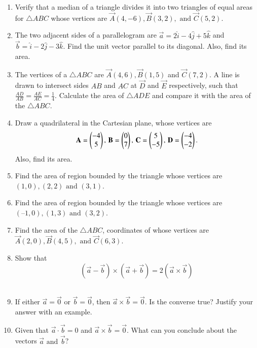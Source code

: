 \begin{enumerate}[label=\thesection.\arabic*,ref=\thesection.\theenumi]
\item Verify that a median of a triangle divides it into two triangles of equal areas for $\triangle ABC$ whose vertices are $\vec{A}(4, -6), \vec{B}(3, 2), \text{ and } \vec{C}(5, 2)$. 
		\label{10/7/3/5}
		\\
\solution
		
\item The two adjacent sides of a parallelogram are 
$\vec{a}= 2\hat{i}-4\hat{j}+5\hat{k}$  and  $\vec{b} =\hat{i}-2\hat{j}-3\hat{k}$.
Find the unit vector parallel to its diagonal. Also, find its area.\\
	\solution
		
\item The vertices of a $\triangle ABC$ are $\vec{A}(4,6), \vec{B}(1,5)$ and  $\vec{C}(7,2)$. A line is drawn to intersect sides $AB$ and $AC$ at $\vec{D}$ and $\vec{E}$ respectively, such that $\frac{AD}{AB} = \frac{AE}{AC} = \frac{1}{4}$. Calculate the area of $\triangle ADE$ and compare it with the area of the $\triangle ABC$.
\\
\solution
	
    \item Draw a quadrilateral in the Cartesian plane, whose vertices are 
    \begin{align}
        \mathbf{A} = \begin{pmatrix}-4\\5\end{pmatrix},\, \mathbf{B} = \begin{pmatrix}0\\7\end{pmatrix},\, 
        \mathbf{C} = \begin{pmatrix}5\\-5\end{pmatrix},\, \mathbf{D} = \begin{pmatrix}-4\\-2\end{pmatrix}.
    \end{align}
    Also, find its area.
\label{chapters/11/10/1/1}
   \\ 
    \solution 

\item Find the area of region bounded by the triangle whose
	vertices are $(1, 0), (2, 2) \text{ and } (3, 1)$. 
\item Find the area of region bounded by the triangle whose vertices
	are $(– 1, 0), (1, 3) \text{ and } (3, 2)$. 
\item Find the area of the $\triangle ABC$, coordinates of whose vertices are $\vec{A}(2, 0), \vec{B}(4, 5), \text{ and } \vec{C}(6, 3)$.
\item Show that $$(\overrightarrow{a}-\overrightarrow{b})\times (\overrightarrow{a}+\overrightarrow{b})=2(\overrightarrow{a}\times \overrightarrow{b})$$
	\\
		\solution
		
\item If either $\overrightarrow{a} = \overrightarrow{0}$ or $\overrightarrow{b} = \overrightarrow{0}$, then $\overrightarrow{a} \times \overrightarrow{b} = \overrightarrow{0}$. Is the converse true? Justify your answer with an example.
	\\
		\solution
		
\item Given that $\overrightarrow{a} \cdot \overrightarrow{b} = 0$ and $\overrightarrow{a} \times \overrightarrow{b} = \overrightarrow{0}$. What can you conclude about the vectors $\overrightarrow{a} \text{ and }\overrightarrow{b}$?
\end{enumerate}

